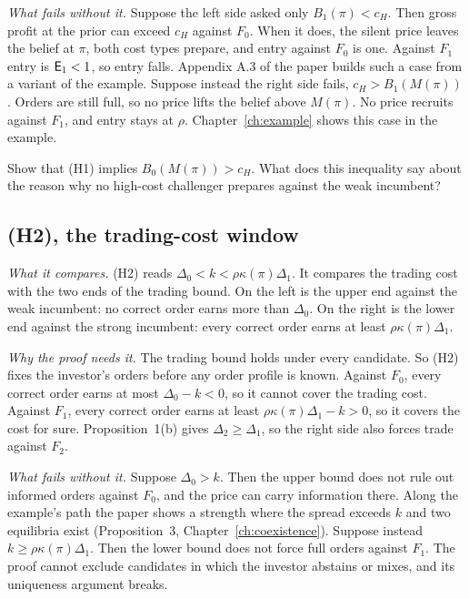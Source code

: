 \emph{What fails without it.} Suppose the left side asked only \(B_1(\pi)<c_H\). Then gross profit at the prior can
exceed \(c_H\) against \(F_0\). When it does, the silent price leaves the belief at \(\pi\), both cost types prepare,
and entry against \(F_0\) is one. Against \(F_1\) entry is \(\mathsf{E}_1<1\), so entry falls. Appendix A.3 of the paper
builds such a case from a variant of the example. Suppose instead the right side fails, \(c_H>B_1(M(\pi))\). Orders are still full,
so no price lifts the belief above \(M(\pi)\). No price recruits against \(F_1\), and entry stays at \(\rho\).
Chapter~\ref{ch:example} shows this case in the example.

\begin{checkyourself}
Show that (H1) implies \(B_0(M(\pi))>c_H\). What does this inequality say about the reason why no high-cost
challenger prepares against the weak incumbent?
\label{q:ccc-missing}
\end{checkyourself}

\subsection{(H2), the trading-cost window}

\emph{What it compares.} (H2) reads \(\Delta_0<k<\rho\kappa(\pi)\Delta_1\). It compares the trading cost with the two
ends of the trading bound. On the left is the upper end against the weak incumbent: no correct order earns more
than \(\Delta_0\). On the right is the lower end against the strong incumbent: every correct order earns at least
\(\rho\kappa(\pi)\Delta_1\).

\emph{Why the proof needs it.} The trading bound holds under every candidate. So (H2) fixes the investor's orders
before any order profile is known. Against \(F_0\), every correct order earns at most \(\Delta_0-k<0\), so it cannot
cover the trading cost. Against \(F_1\), every correct order earns at least \(\rho\kappa(\pi)\Delta_1-k>0\), so it
covers the cost for sure. Proposition~1(b) gives \(\Delta_2\ge\Delta_1\), so the right side also forces trade
against \(F_2\).

\emph{What fails without it.} Suppose \(\Delta_0>k\). Then the upper bound does not rule out informed orders
against \(F_0\), and the price can carry information there. Along the example's path the paper shows a strength
where the spread exceeds \(k\) and two equilibria exist (Proposition~3, Chapter~\ref{ch:coexistence}). Suppose
instead \(k\ge\rho\kappa(\pi)\Delta_1\). Then the lower bound does not force full orders against \(F_1\). The proof
cannot exclude candidates in which the investor abstains or mixes, and its uniqueness argument breaks.

